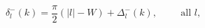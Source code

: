 \begin{equation}
\label{Eq_0224}
\delta^{-}_l(k) = \frac{\pi}{2}(|l| - W) + \Delta^{-}_l(k),
	\hspace{1cm} \text{all } l,
\end{equation}

